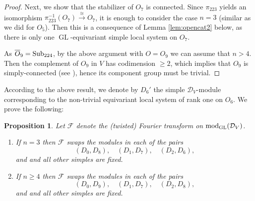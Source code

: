 \documentclass[11pt,reqno]{amsart}
\newcommand{\D}{\mathcal{D}}
\newcommand{\tn}{\textnormal}
\newcommand{\GL}{\operatorname{GL}}
\newcommand{\mc}[1]{\mathcal{#1}}
\newcommand{\ol}[1]{\overline{#1}}
\newtheorem{prop}[theorem]{Proposition}
\numberwithin{equation}{section}
\begin{document}
\begin{proof}
Next, we show that the stabilizer of $O_7$ is connected. Since $\pi_{223}$ yields an isomorphism $\pi_{223}^{-1}(O_7) \xrightarrow{\cong} O_7$, it is enough to consider the case $n=3$ (similar as we did for $O_5$). Then this is a consequence of Lemma \ref{lem:opencat2} below, as there is only one $\GL$-equivariant simple local system on $O_7$.

As $\ol{O}_9 = \tn{Sub}_{224}$, by the above argument with $O=O_9$ we can assume that $n>4$. Then the complement of $O_9$ in $V$ has codimension $\geq 2$, which implies that $O_9$ is simply-connected (see \cite[Remark 4.10]{lHorincz2019categories}), hence its component group must be trivial.
\end{proof}

According to the above result, we denote by $D_6'$ the simple $\D_V$-module corresponding to the non-trivial equivariant local system of rank one on $O_6$. We prove the following:

\begin{prop}\label{prop:fourier}
Let $\mc{F}$ denote the (twisted) Fourier transform on $\tn{mod}_{\GL}(\D_V)$.
\begin{enumerate}
\item If $n=3$ then $\mc{F}$ swaps the modules in each of the pairs
$$
(D_0,D_8),\quad (D_1,D_7),\quad (D_2,D_6),
$$
and and all other simples are fixed.
\item If $n\geq 4$ then $\mc{F}$ swaps the modules in each of the pairs
$$
(D_0,D_9),\quad (D_1,D_7),\quad (D_2,D_8), 
$$
and and all other simples are fixed.
\end{enumerate}
	
\end{prop}
\end{document}
